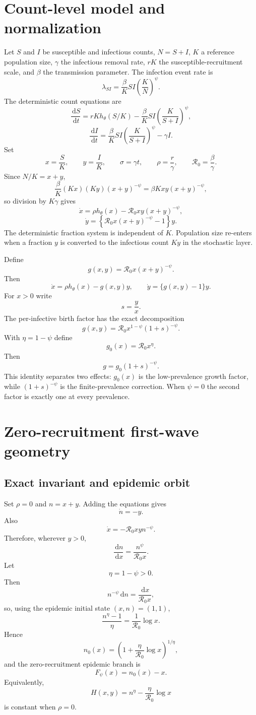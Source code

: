 \documentclass[11pt]{article}
\newcommand{\Rzero}{\mathcal R_0}
\newcommand{\hth}{h_\theta}
\newcommand{\Fpsi}{F_\psi}
\newcommand{\dd}{\,\mathrm{d}}
\newcommand{\gh}{g_0}
\begin{document}
\section{Count-level model and normalization}

Let $S$ and $I$ be susceptible and infectious counts, $N=S+I$, $K$ a reference population size, $\gamma$ the infectious removal rate, $rK$ the susceptible-recruitment scale, and $\beta$ the transmission parameter. The infection event rate is
\[
\lambda_{SI}
=\frac{\beta}{K}SI\left(\frac K N\right)^\psi.
\]
The deterministic count equations are
\[
\frac{\dd S}{\dd t}
=rK\hth(S/K)-\frac{\beta}{K}SI\left(\frac K{S+I}\right)^\psi,
\]
\[
\frac{\dd I}{\dd t}
=\frac{\beta}{K}SI\left(\frac K{S+I}\right)^\psi-\gamma I.
\]
Set
\[
x=\frac SK,
\qquad
y=\frac IK,
\qquad
\sigma=\gamma t,
\qquad
\rho=\frac r\gamma,
\qquad
\Rzero=\frac\beta\gamma.
\]
Since $N/K=x+y$,
\[
\frac{\beta}{K}(Kx)(Ky)(x+y)^{-\psi}
=\beta Kxy(x+y)^{-\psi},
\]
so division by $K\gamma$ gives
\[
\boxed{
\dot x
=\rho\hth(x)-\Rzero xy(x+y)^{-\psi},
}
\]
\[
\boxed{
\dot y
=\left\{\Rzero x(x+y)^{-\psi}-1\right\}y.
}
\]
The deterministic fraction system is independent of $K$. Population size re-enters when a fraction $y$ is converted to the infectious count $Ky$ in the stochastic layer.

Define
\[
g(x,y)=\Rzero x(x+y)^{-\psi}.
\]
Then
\[
\dot x=\rho\hth(x)-g(x,y)y,
\qquad
\dot y=\{g(x,y)-1\}y.
\]
For $x>0$ write
\[
s=\frac yx.
\]
The per-infective birth factor has the exact decomposition
\[
\boxed{
g(x,y)=\Rzero x^{1-\psi}(1+s)^{-\psi}.}
\]
With $\eta=1-\psi$ define
\[
\gh(x)=\Rzero x^\eta.
\]
Then
\[
g=\gh(1+s)^{-\psi}.
\]
This identity separates two effects: $\gh(x)$ is the low-prevalence growth factor, while $(1+s)^{-\psi}$ is the finite-prevalence correction. When $\psi=0$ the second factor is exactly one at every prevalence.

\section{Zero-recruitment first-wave geometry}
\label{sec:zerorho}

\subsection{Exact invariant and epidemic orbit}
Set $\rho=0$ and $n=x+y$. Adding the equations gives
\[
\dot n=-y.
\]
Also
\[
\dot x=-\Rzero xy n^{-\psi}.
\]
Therefore, wherever $y>0$,
\[
\frac{\dd n}{\dd x}
=\frac{n^\psi}{\Rzero x}.
\]
Let
\[
\eta=1-\psi>0.
\]
Then
\[
n^{-\psi}\dd n=\frac{\dd x}{\Rzero x},
\]
so, using the epidemic initial state $(x,n)=(1,1)$,
\[
\frac{n^\eta-1}{\eta}=\frac1{\Rzero}\log x.
\]
Hence
\[
\boxed{
n_0(x)
=\left(1+\frac\eta{\Rzero}\log x\right)^{1/\eta},
}
\]
and the zero-recruitment epidemic branch is
\[
\boxed{
\Fpsi(x)=n_0(x)-x.
}
\]
Equivalently,
\[
H(x,y)=n^\eta-\frac\eta{\Rzero}\log x
\]
is constant when $\rho=0$.
\end{document}
